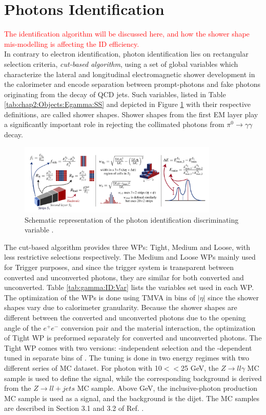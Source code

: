\section{Photons Identification}
\label{gamma:ID}
\textcolor{red}{
The identification algorithm will be discussed here, and how the shower shape mis-modelling is affecting the ID efficiency. \\
}
In contrary to electron identification, photon identification lies on rectangular selection criteria, \emph{cut-based algorithm}, using a set of global variables which characterize the lateral and longitudinal electromagnetic shower development in the calorimeter and encode separation between prompt-photons and fake photons originating from the decay of QCD jets. Such variables, listed in Table \ref{tab:chap2:Objects:Egamma:SS} and depicted in Figure \ref{fig:gamma:ID:SS} with their respective definitions, are called shower shapes. Shower shapes from the first EM layer play a significantly important role in rejecting the collimated photons from $\pi^0\rightarrow\gamma\gamma$ decay. \\ 
\begin{figure}[ht]
    \centering
    \includegraphics[width=0.85\textwidth]{Ch3/Img/ShowerShapes.png}
    \caption{Schematic representation of the photon identification discriminating variable \cite{ShowerShapes_fig}. \\}
    \label{fig:gamma:ID:SS}
\end{figure}
The cut-based algorithm provides three WPs: Tight, Medium and Loose, with less restrictive selections respectively. The Medium and Loose WPs mainly used for Trigger purposes, and since the trigger system is transparent between converted and unconverted photons, they are similar for both converted and unconverted. Table \ref{tab:gamma:ID:Var} lists the variables set used in each WP. The optimization of the WPs is done using TMVA \cite{TMVA} in bins of $|\eta|$ since the shower shapes vary due to calorimeter granularity. Because the shower shapes are different between the converted and unconverted photons due to the opening angle of the $e^+e^-$ conversion pair and the material interaction, the optimization of Tight WP is preformed separately for converted and unconverted photons. The Tight WP comes with two versions: \eT-independent selection and the \eT-dependent tuned in separate bins of \eT. The tuning is done in two energy regimes with two different series of MC dataset. For photon with 10$<$\eT$<$25 GeV, the $Z\rightarrow ll\gamma$ MC sample is used to define the signal, while the corresponding background is derived from the $Z\rightarrow ll+jets$ MC sample. Above  GeV, the inclusive-photon production MC sample is used as a signal, and the background is the dijet. The MC samples are described in Section 3.1 and 3.2 of Ref. \cite{Egamma_Perf_2017}.    
